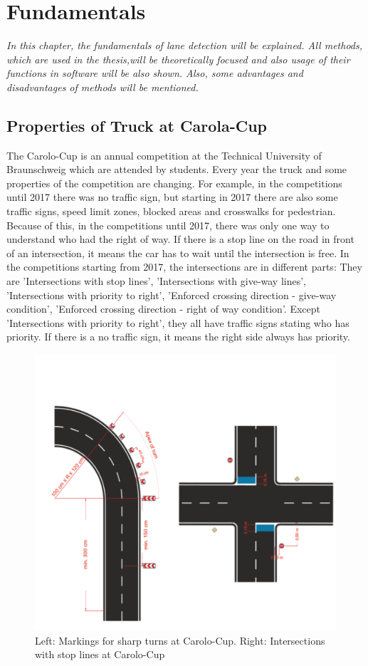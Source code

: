 %
\chapter{Fundamentals}\label{cha:Fundamentals}
%
\emph{\color{blue}In this chapter, the fundamentals of lane detection will be explained. All methods, which are used in the thesis,will be theoretically focused and also usage of their functions in software will be also shown. Also, some advantages and disadvantages of methods will be mentioned.} 
%
\section{Properties of Truck at Carola-Cup}\label{sec:Properties of Truck at Carolo-Cup}
%
The Carolo-Cup is an annual competition at the Technical University of Braunschweig which are attended by students. Every year the truck and some properties of the competition are changing. For example, in the competitions until 2017 there was no traffic sign, but starting in 2017 there are also some traffic signs, speed limit zones, blocked areas and crosswalks for pedestrian. Because of this, in the competitions until 2017, there was only one way to understand who had the right of way. If there is a stop line on the road in front of an intersection, it means the car has to wait until the intersection is free. In the competitions starting from 2017, the intersections are in different parts: They are 'Intersections with stop lines', 'Intersections with give-way lines', 'Intersections with priority to right', 'Enforced crossing direction - give-way condition', 'Enforced crossing direction - right of way condition'. Except 'Intersections with priority to right', they all have traffic signs stating who has priority. If there is a no traffic sign, it means the right side always has priority.\cite{Carolo_Cup}

\begin{figure}[H]
	\centering
	\hspace*{0cm}   
	\includegraphics[width=120mm,scale=1]{./Bilder/Intersections.png}
	\caption{Left: Markings for sharp turns at Carolo-Cup.
Right: Intersections with stop lines at Carolo-Cup\cite{Carolo_Cup}}
\end{figure}




